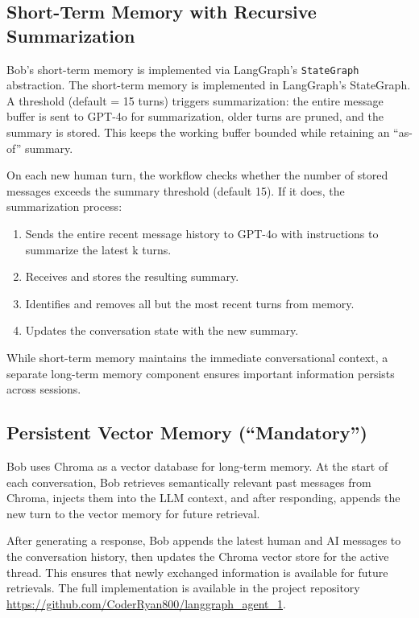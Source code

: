 \documentclass[conference]{IEEEtran}
\begin{document}
\subsection{Short-Term Memory with Recursive Summarization}
Bob's short-term memory is implemented via LangGraph's \texttt{StateGraph} abstraction. 
The short-term memory is implemented in LangGraph’s StateGraph. 
A threshold (default = 15 turns) triggers summarization: the entire message 
buffer is sent to GPT-4o for summarization, older turns are pruned, 
and the summary is stored. This keeps the working buffer bounded 
while retaining an “as-of” summary.

On each new human turn, the workflow checks whether the number of stored messages exceeds the summary threshold (default 15).
If it does, the summarization process:
\begin{enumerate}[leftmargin=*]
	\item Sends the entire recent message history to GPT-4o with instructions to summarize the latest k turns.
	\item Receives and stores the resulting summary.
	\item Identifies and removes all but the most recent turns from memory.
	\item Updates the conversation state with the new summary.
\end{enumerate}

While short-term memory maintains the immediate conversational context,
a separate long-term memory component ensures important information 
persists across sessions.

\subsection{Persistent Vector Memory (``Mandatory'')}
Bob uses Chroma as a vector database for long-term memory. 
At the start of each conversation, Bob retrieves semantically 
relevant past messages from Chroma, injects them into the LLM 
context, and after responding, appends the new turn to the 
vector memory for future retrieval.

After generating a response, Bob appends the latest human and 
AI messages to the conversation history, then updates the 
Chroma vector store for the active thread. This ensures 
that newly exchanged information is available for future 
retrievals. The full implementation is available in the 
project repository \url{https://github.com/CoderRyan800/langgraph_agent_1}.
\end{document}
